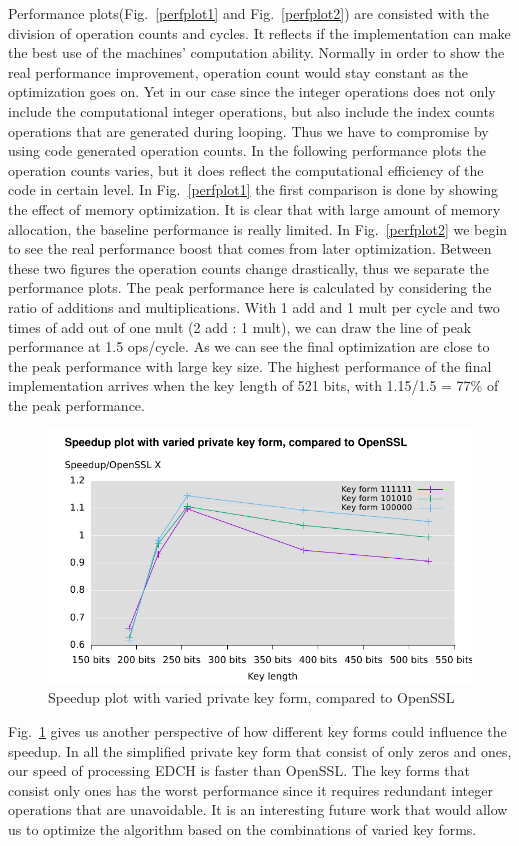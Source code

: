Performance plots(Fig.~\ref{perfplot1} and Fig.~\ref{perfplot2}) are consisted with the division of operation counts and cycles. It reflects if the implementation can make the best use of the machines' computation ability. Normally in order to show the real performance improvement, operation count would stay constant as the optimization goes on. Yet in our case since the integer operations does not only include the computational integer operations, but also include the index counts operations that are generated during looping. Thus we have to compromise by using code generated operation counts. In the following performance plots the operation counts varies, but it does reflect the computational efficiency of the code in certain level. In Fig.~\ref{perfplot1} the first comparison is done by showing the effect of memory optimization. It is clear that with large amount of memory allocation, the baseline performance is really limited. In Fig.~\ref{perfplot2} we begin to see the real performance boost that comes from later optimization. Between these two figures the operation counts change drastically, thus we separate the performance plots. The peak performance here is calculated by considering the ratio of additions and multiplications. With 1 add and 1 mult per cycle and two times of add out of one mult (2 add : 1 mult), we can draw the line of peak performance at 1.5 ops/cycle. As we can see the final optimization are close to the peak performance with large key size. The highest performance of the final implementation arrives when the key length of 521 bits, with 1.15/1.5 = 77\% of the peak performance.
\begin{figure}[h!]\centering
  \includegraphics[scale=0.7]{keysize}
  \caption{Speedup plot with varied private key form, compared to OpenSSL\label{keysize}}
\end{figure}

Fig.~\ref{keysize} gives us another perspective of how different key forms could influence the speedup.  In all the simplified private key form that consist of only zeros and ones, our speed of processing EDCH is faster than OpenSSL. The key forms that consist only ones has the worst performance since it requires redundant integer operations that are unavoidable. It is an interesting future work that would allow us to optimize the algorithm based on the combinations of varied key forms. 